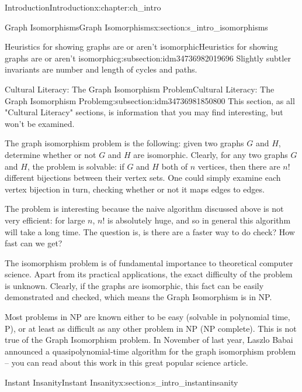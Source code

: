 \documentclass[oneside,10pt,]{book}
\numberwithin{equation}{section}
\begin{document}
\begin{chapterptx}{Introduction}{}{Introduction}{}{}{x:chapter:ch_intro}
\begin{sectionptx}{Graph Isomorphisms}{}{Graph Isomorphisms}{}{}{x:section:s_intro_isomorphisms}
\begin{subsectionptx}{Heuristics for showing graphs are or aren't isomorphic}{}{Heuristics for showing graphs are or aren't isomorphic}{}{}{g:subsection:idm34736982019696}
Slightly subtler invariants are number and length of cycles and paths.%
\end{subsectionptx}
%
%
\typeout{************************************************}
\typeout{************************************************}
%
\begin{subsectionptx}{Cultural Literacy: The Graph Isomorphism Problem}{}{Cultural Literacy: The Graph Isomorphism Problem}{}{}{g:subsection:idm34736981850800}
This section, as all "Cultural Literacy" sections, is information that you may find interesting, but won't be examined.%
\par
The graph isomorphism problem is the following: given two graphs \(G\) and \(H\), determine whether or not \(G\) and \(H\) are isomorphic. Clearly, for any two graphs \(G\) and \(H\), the problem is solvable: if \(G\) and \(H\) both of \(n\) vertices, then there are \(n!\) different bijections between their vertex sets.  One could simply examine each vertex bijection in turn, checking whether or not it maps edges to edges.%
\par
The problem is interesting because the naive algorithm discussed above is not very efficient: for large \(n\), \(n!\) is absolutely huge, and so in general this algorithm will take a long time.  The question is, is there are a faster way to do check? How fast can we get?%
\par
The isomorphism problem is of fundamental importance to theoretical computer science. Apart from its practical applications, the exact difficulty of the problem is unknown. Clearly, if the graphs are isomorphic, this fact can be easily demonstrated and checked, which means the Graph Isomorphism is in NP.%
\par
Most problems in NP are known either to be easy (solvable in polynomial time, P), or at least as difficult as any other problem in NP (NP complete). This is not true of the Graph Isomorphism problem. In November of last year, Laszlo Babai announced a quasipolynomial-time algorithm for the graph isomorphism problem – you can read about this work in this great popular science article.%
\end{subsectionptx}
\end{sectionptx}
%
%
\typeout{************************************************}
\typeout{************************************************}
%
\begin{sectionptx}{Instant Insanity}{}{Instant Insanity}{}{}{x:section:s_intro_instantinsanity}

\end{sectionptx}
\end{chapterptx}
\end{document}
